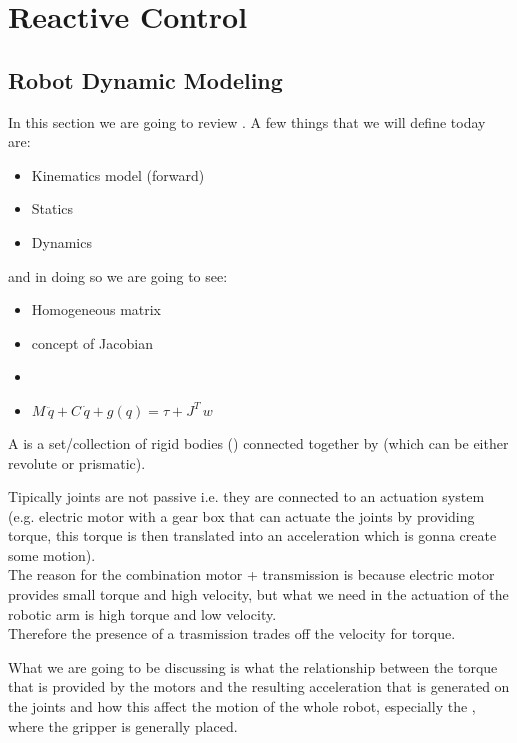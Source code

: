 \chapter{Reactive Control}

\section{Robot Dynamic Modeling}
In this section we are going to review . A few things that we will define today are:
\begin{itemize}
\item Kinematics model (forward)
\item Statics
\item Dynamics
\end{itemize}

and in doing so we are going to see:
\begin{itemize}
\item Homogeneous matrix
\item concept of Jacobian
\item \textellipsis
\item $M\,\ddot{q} + C\,\dot{q} + g(q) = \tau + J^{T}\,w$
\end{itemize}

A  is a set/collection of rigid bodies () connected together by  (which can be either revolute or prismatic).

Tipically joints are not passive i.e. they are connected to an actuation system (e.g. electric motor with a gear box that can actuate the joints by providing torque, this torque is then translated into an acceleration which is gonna create some motion).\\
The reason for the combination motor + transmission is because electric motor provides small torque and high velocity, but what we need in the actuation of the robotic arm is high torque and low velocity.\\
Therefore the presence of a trasmission trades off the velocity for torque.

What we are going to be discussing is what the relationship between the torque that is provided by the motors and the resulting acceleration that is generated on the joints and how this affect the motion of the whole robot, especially the , where the gripper is generally placed.


